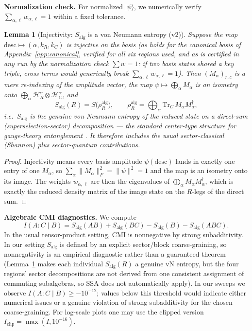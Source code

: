 \documentclass[11pt]{article}
\newtheorem{lemma}{Lemma}
\theoremstyle{remark}
\newcommand{\Salg}{S_{\mathrm{alg}}}
\begin{document}
\textbf{Normalization check.} For normalized $|\psi\rangle$, we
numerically verify $\sum_{\alpha,\ell} w_{\alpha,\ell} = 1$ within a
fixed tolerance.

\begin{lemma}[Injectivity: $\Salg$ is a von Neumann entropy (v2)]
\label{lem:inj}
Suppose the map $\mathrm{desc} \mapsto (\alpha, k_R, k_C)$ is injective
on the basis (as holds for the canonical basis of
Appendix~\ref{app:canonical}, verified for all six regions used, and as
is certified in any run by the normalization check $\sum w = 1$: if two
basis states shared a key triple, cross terms would generically break
$\sum_{\alpha,\ell} w_{\alpha,\ell} = 1$). Then $(M_\alpha)_{r,c}$ is a
mere re-indexing of the amplitude vector, the map $\psi \mapsto
\bigoplus_\alpha M_\alpha$ is an isometry onto $\bigoplus_\alpha
\mathcal{H}_R^\alpha \otimes \mathcal{H}_C^\alpha$, and
\[
\Salg(R) = S\bigl(\rho_R^{\mathrm{alg}}\bigr), \qquad
\rho_R^{\mathrm{alg}} = \bigoplus_\alpha \mathrm{Tr}_{C}\,
M_\alpha M_\alpha^\dagger,
\]
i.e.\ $\Salg$ is the genuine von Neumann entropy of the reduced state on
a direct-sum (superselection-sector) decomposition --- the standard
center-type structure for gauge-theory entanglement \cite{CHR}. It
therefore includes the usual sector-classical (Shannon) plus
sector-quantum contributions.
\end{lemma}

\begin{proof}
Injectivity means every basis amplitude $\psi(\mathrm{desc})$ lands in
exactly one entry of one $M_\alpha$, so $\sum_{\alpha}
\|M_\alpha\|_F^2 = \|\psi\|^2 = 1$ and the map is an isometry onto its
image. The weights $w_{\alpha,\ell}$ are then the eigenvalues of
$\bigoplus_\alpha M_\alpha M_\alpha^\dagger$, which is exactly the
reduced density matrix of the image state on the $R$-legs of the
direct sum.
\end{proof}

\textbf{Algebraic CMI diagnostics.} We compute
\[
I(A : C \mid B) = \Salg(AB) + \Salg(BC) - \Salg(B) - \Salg(ABC).
\]
In the usual tensor-product setting, CMI is nonnegative by strong
subadditivity. In our setting $\Salg$ is defined by an explicit
sector/block coarse-graining, so nonnegativity is an empirical
diagnostic rather than a guaranteed theorem
(Lemma~\ref{lem:inj} makes each individual $\Salg(R)$ a genuine vN
entropy, but the four regions' sector decompositions are not derived
from one consistent assignment of commuting subalgebras, so SSA does not
automatically apply). In our sweeps we observe $I(A : C \mid B) \ge
-10^{-12}$; values below this threshold would indicate either numerical
issues or a genuine violation of strong subadditivity for the chosen
coarse-graining. For log-scale plots one may use the clipped version
$I_{\mathrm{clip}} = \max(I, 10^{-16})$.
\end{document}
